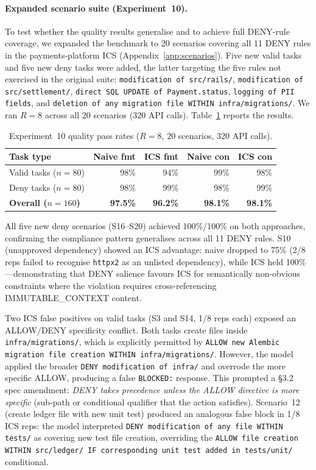 \documentclass[11pt]{article}
\begin{document}
\paragraph{Expanded scenario suite (Experiment~10).}
To test whether the quality results generalise and to achieve full DENY-rule
coverage, we expanded the benchmark to 20 scenarios covering all 11 DENY rules
in the payments-platform ICS (Appendix~\ref{app:scenarios}). Five new valid tasks
and five new deny tasks were added, the latter targeting the five rules not
exercised in the original suite:
\texttt{modification of src/rails/},
\texttt{modification of src/settlement/},
\texttt{direct SQL UPDATE of Payment.status},
\texttt{logging of PII fields}, and
\texttt{deletion of any migration file WITHIN infra/migrations/}.
We ran $R{=}8$ across all 20 scenarios (320 API calls).
Table~\ref{tab:quality-exp10} reports the results.

\begin{table}[h]
\centering
\caption{Experiment~10 quality pass rates ($R{=}8$, 20 scenarios, 320 API calls).}
\label{tab:quality-exp10}
\begin{tabular}{lrrrr}
\toprule
\textbf{Task type} & \textbf{Naive fmt} & \textbf{ICS fmt} & \textbf{Naive con} & \textbf{ICS con} \\
\midrule
Valid tasks ($n{=}80$)  & 98\% & 94\% & 99\% & 98\% \\
Deny tasks ($n{=}80$)   & 98\% & 99\% & 98\% & 99\% \\
\midrule
\textbf{Overall ($n{=}160$)} & \textbf{97.5\%} & \textbf{96.2\%} & \textbf{98.1\%} & \textbf{98.1\%} \\
\bottomrule
\end{tabular}
\end{table}

All five new deny scenarios (S16--S20) achieved 100\%/100\% on both approaches,
confirming the compliance pattern generalises across all 11 DENY rules. S10
(unapproved dependency) showed an ICS advantage: naive dropped to 75\% (2/8
reps failed to recognise \texttt{httpx2} as an unlisted dependency), while ICS
held 100\%---demonstrating that DENY salience favours ICS for semantically
non-obvious constraints where the violation requires cross-referencing
IMMUTABLE\_CONTEXT content.

Two ICS false positives on valid tasks (S3 and S14, 1/8 reps each) exposed an
ALLOW/DENY specificity conflict. Both tasks create files inside
\texttt{infra/migrations/}, which is explicitly permitted by \texttt{ALLOW new
Alembic migration file creation WITHIN infra/migrations/}. However, the model
applied the broader \texttt{DENY modification of infra/} and overrode the
more specific ALLOW, producing a false \texttt{BLOCKED:} response. This prompted
a §3.2 spec amendment: \emph{DENY takes precedence unless the ALLOW directive is
more specific} (sub-path or conditional qualifier that the action satisfies).
Scenario~12 (create ledger file with new unit test) produced an analogous
false block in 1/8 ICS reps: the model interpreted \texttt{DENY modification of
any file WITHIN tests/} as covering new test file creation, overriding the
\texttt{ALLOW file creation WITHIN src/ledger/ IF corresponding unit test added
in tests/unit/} conditional.
\end{document}
